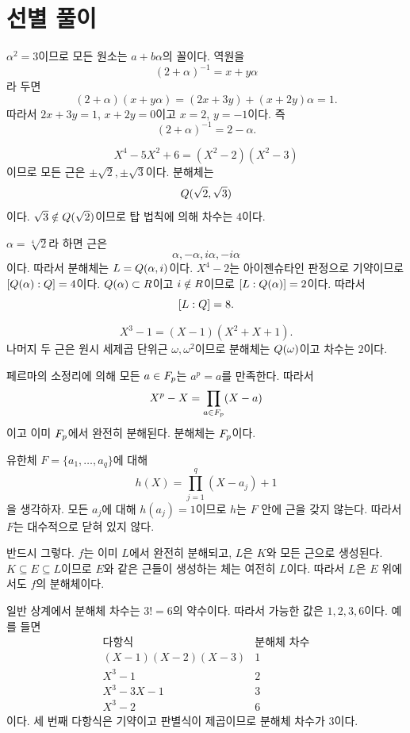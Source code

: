 \section{선별 풀이}

\begin{solution}[연습문제 1]
$\alpha^2=3$이므로 모든 원소는 $a+b\alpha$의 꼴이다. 역원을
\[
  (2+\alpha)^{-1}=x+y\alpha
\]
라 두면
\[
  (2+\alpha)(x+y\alpha)=(2x+3y)+(x+2y)\alpha=1.
\]
따라서 $2x+3y=1$, $x+2y=0$이고 $x=2$, $y=-1$이다. 즉
\[
  (2+\alpha)^{-1}=2-\alpha.
\]
\end{solution}

\begin{solution}[연습문제 2]
\[
  X^4-5X^2+6=(X^2-2)(X^2-3)
\]
이므로 모든 근은 $\pm\sqrt2,\pm\sqrt3$이다. 분해체는
\[
  Q(\sqrt2,\sqrt3)
\]
이다. $\sqrt3\notin Q(\sqrt2)$이므로 탑 법칙에 의해 차수는 $4$이다.
\end{solution}

\begin{solution}[연습문제 3]
$\alpha=\sqrt[4]{2}$라 하면 근은
\[
  \alpha,-\alpha,i\alpha,-i\alpha
\]
이다. 따라서 분해체는 $L=Q(\alpha,i)$이다. $X^4-2$는 아이젠슈타인 판정으로 기약이므로 $[Q(\alpha):Q]=4$이다. $Q(\alpha)\subset R$이고 $i\notin R$이므로 $[L:Q(\alpha)]=2$이다. 따라서
\[
  [L:Q]=8.
\]
\end{solution}

\begin{solution}[연습문제 4]
\[
  X^3-1=(X-1)(X^2+X+1).
\]
나머지 두 근은 원시 세제곱 단위근 $\omega,\omega^2$이므로 분해체는 $Q(\omega)$이고 차수는 $2$이다.
\end{solution}

\begin{solution}[연습문제 7]
페르마의 소정리에 의해 모든 $a\in F_p$는 $a^p=a$를 만족한다. 따라서
\[
  X^p-X=\prod_{a\in F_p}(X-a)
\]
이고 이미 $F_p$에서 완전히 분해된다. 분해체는 $F_p$이다.
\end{solution}

\begin{solution}[연습문제 8]
유한체 $F=\{a_1,\dots,a_q\}$에 대해
\[
  h(X)=\prod_{j=1}^q(X-a_j)+1
\]
을 생각하자. 모든 $a_j$에 대해 $h(a_j)=1$이므로 $h$는 $F$ 안에 근을 갖지 않는다. 따라서 $F$는 대수적으로 닫혀 있지 않다.
\end{solution}

\begin{solution}[연습문제 9]
반드시 그렇다. $f$는 이미 $L$에서 완전히 분해되고, $L$은 $K$와 모든 근으로 생성된다. $K\subseteq E\subseteq L$이므로 $E$와 같은 근들이 생성하는 체는 여전히 $L$이다. 따라서 $L$은 $E$ 위에서도 $f$의 분해체이다.
\end{solution}

\begin{solution}[연습문제 10]
일반 상계에서 분해체 차수는 $3!=6$의 약수이다. 따라서 가능한 값은 $1,2,3,6$이다. 예를 들면
\[
\begin{array}{c|c}
\text{다항식} & \text{분해체 차수}\\ \hline
(X-1)(X-2)(X-3) & 1\\
X^3-1 & 2\\
X^3-3X-1 & 3\\
X^3-2 & 6
\end{array}
\]
이다. 세 번째 다항식은 기약이고 판별식이 제곱이므로 분해체 차수가 $3$이다.
\end{solution}
